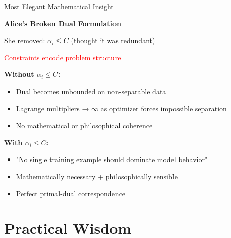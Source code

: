 \documentclass[aspectratio=169]{beamer}
\begin{document}
\begin{frame}{Most Elegant Mathematical Insight}

\textbf{Alice's Broken Dual Formulation}

\vspace{0.3cm}
She removed: $\alpha_i \leq C$ (thought it was redundant)

\vspace{0.5cm}
\begin{center}
\Large
\textcolor{red}{Constraints encode problem structure}
\end{center}

\vspace{0.5cm}
\textbf{Without $\alpha_i \leq C$:}
\begin{itemize}
\item Dual becomes unbounded on non-separable data
\item Lagrange multipliers → $\infty$ as optimizer forces impossible separation
\item No mathematical or philosophical coherence
\end{itemize}

\vspace{0.3cm}
\textbf{With $\alpha_i \leq C$:}
\begin{itemize}
\item "No single training example should dominate model behavior"
\item Mathematically necessary + philosophically sensible
\item Perfect primal-dual correspondence
\end{itemize}

\end{frame}


\section{Practical Wisdom}
\end{document}
